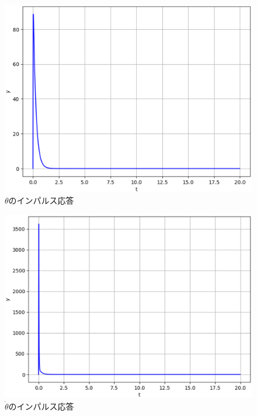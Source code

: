 \documentclass[a4paper,10.5pt]{ltjsarticle}
\begin{document}
\begin{figure}[h]
  \centering
  \includegraphics[scale=0.5]{figure8.eps}
  \caption{$\theta$のインパルス応答}
\end{figure}

\begin{figure}[h]
  \centering
  \includegraphics[scale=0.5]{figure9.eps}
  \caption{$\dot{\theta}$のインパルス応答}
\end{figure}
\end{document}
